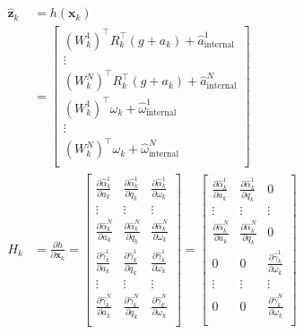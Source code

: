 \documentclass[11pt]{article}
\newcommand{\pd}[2]{\frac{\partial #1}{\partial #2}} %
\begin{document}
\begin{align*}
    \hat{\mathbf{z}}_k &= h(\mathbf{x}_k) \\
    &= \begin{bmatrix}
        (W_k^1)^\top R_k^\top (g + a_k) + \hat{a}^1_{\text{internal}} \\
        \vdots \\
        (W_k^N)^\top R_k^\top (g + a_k) + \hat{a}^N_{\text{internal}} \\
        (W_k^1)^\top \omega_k + \hat{\omega}^1_{\text{internal}} \\
        \vdots \\
        (W_k^N)^\top \omega_k + \hat{\omega}^N_{\text{internal}} \\
    \end{bmatrix} \\
    H_k &= \pd{h}{\mathbf{x}_k} = \begin{bmatrix}
        \pd{\hat{\alpha}^1_k}{a_k} & \pd{\hat{\alpha}^1_k}{q_k} & \pd{\hat{\alpha}^1_k}{\omega_k} \\
        \vdots & \vdots & \vdots \\
        \pd{\hat{\alpha}^N_k}{a_k} & \pd{\hat{\alpha}^N_k}{q_k} & \pd{\hat{\alpha}^N_k}{\omega_k} \\
        \pd{\hat{\gamma}^1_k}{a_k} & \pd{\hat{\gamma}^1_k}{q_k} & \pd{\hat{\gamma}^1_k}{\omega_k} \\
        \vdots & \vdots & \vdots \\
        \pd{\hat{\gamma}^N_k}{a_k} & \pd{\hat{\gamma}^N_k}{q_k} & \pd{\hat{\gamma}^N_k}{\omega_k} \\
    \end{bmatrix} = \begin{bmatrix}
        \pd{\hat{\alpha}^1_k}{a_k} & \pd{\hat{\alpha}^1_k}{q_k} & 0 \\
        \vdots & \vdots & \vdots \\
        \pd{\hat{\alpha}^N_k}{a_k} & \pd{\hat{\alpha}^N_k}{q_k} & 0 \\
        0 & 0 & \pd{\hat{\gamma}^1_k}{\omega_k} \\
        \vdots & \vdots & \vdots \\
        0 & 0 & \pd{\hat{\gamma}^N_k}{\omega_k} \\
    \end{bmatrix} \\

\end{align*}
\end{document}

